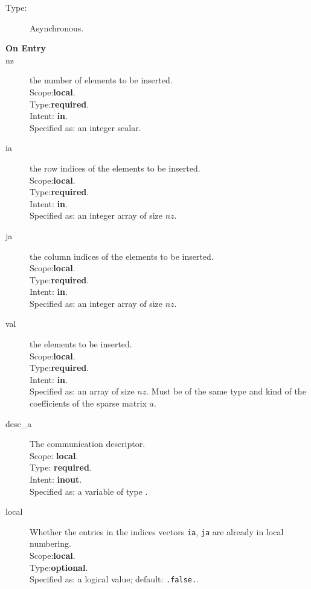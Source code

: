 \begin{description}
\item[Type:] Asynchronous.
\item[\bf On Entry]
\item[nz] the number of elements to be inserted.\\
Scope:{\bf local}.\\
Type:{\bf required}.\\
Intent: {\bf in}.\\
Specified as: an integer scalar.
\item[ia] the row indices of the elements to be inserted.\\
Scope:{\bf local}.\\
Type:{\bf required}.\\
Intent: {\bf in}.\\
Specified as: an integer array of size $nz$.
\item[ja] the column indices of the elements to be inserted.\\
Scope:{\bf local}.\\
Type:{\bf required}.\\
Intent: {\bf in}.\\
Specified as: an integer array of size $nz$.
\item[val] the elements to be inserted.\\
Scope:{\bf local}.\\
Type:{\bf required}.\\
Intent: {\bf in}.\\
Specified as: an array of size $nz$. Must be of the same type and kind
of the coefficients  of the sparse matrix $a$.
\item[desc\_a] The communication descriptor.\\
Scope: {\bf local}. \\
Type: {\bf required}.\\
Intent: {\bf inout}.\\
Specified as: a variable of type \descdata.\\
\item[local] Whether the entries in the indices vectors \verb|ia|,
  \verb|ja| are already in local  numbering. \\
 Scope:{\bf local}.\\
 Type:{\bf optional}.\\
 Specified as: a logical value; default: \verb|.false.|.

\end{description}


